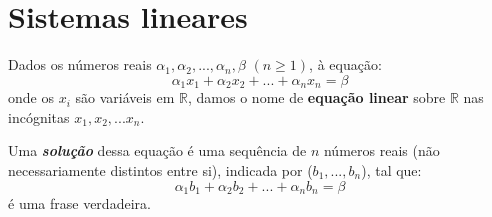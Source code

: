 \section{Sistemas lineares}

\begin{df}
Dados os números reais $\alpha_{1},\alpha_{2},...,\alpha_{n},\beta $ $(n\geqslant1)$, à equação:\\
\begin{equation*}
\alpha_{1}x_{1}+\alpha_{2}x_{2}+...+\alpha_{n}x_{n}=\beta
\end{equation*} 
onde os $x_{i}$ são variáveis em $\mathbb{R}$, damos o nome de \textbf{equação linear} sobre $\mathbb{R}$ nas incógnitas $x_{1},x_{2},...x_{n}$.\\

\end{df}

Uma \textbf{\textit{solução}} dessa equação é uma sequência de $n$ números reais (não necessariamente distintos entre si), indicada por ($b_{1},...,b_{n}$), tal que:\\
\begin{equation*}
\alpha_{1}b_{1}+\alpha_{2}b_{2}+...+\alpha_{n}b_{n}=\beta
\end{equation*} 
é uma frase verdadeira.

